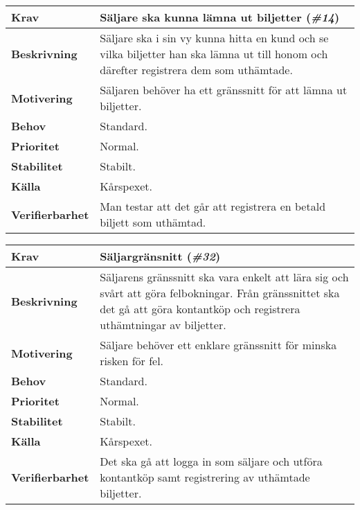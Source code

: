 \documentclass[a4paper, twoside, 11pt, titlepage]{article}
\begin{document}
		\begin{tabular} { p{2.6cm} p{12.5cm} }
			\hline
			\sffamily\textbf{Krav} & Säljare ska kunna lämna ut biljetter (\emph{\#14})  \\
			\hline
			\sffamily\textbf{Beskrivning} & Säljare ska i sin vy kunna hitta en kund och se vilka biljetter han ska lämna ut till honom och därefter registrera dem som uthämtade.  \\
			\hline
			\sffamily\textbf{Motivering} & Säljaren behöver ha ett gränssnitt för att lämna ut biljetter.  \\
			\hline
			\sffamily\textbf{Behov} & Standard.  \\
			\hline
			\sffamily\textbf{Prioritet} & Normal.  \\
			\hline
			\sffamily\textbf{Stabilitet} & Stabilt.  \\
			\hline
			\sffamily\textbf{Källa} & Kårspexet.  \\
			\hline
			\sffamily\textbf{Verifierbarhet} & Man testar att det går att registrera en betald biljett som uthämtad.  \\
			\hline
		\end{tabular}
		\vspace{6mm}

		\begin{tabular} { p{2.6cm} p{12.5cm} }
			\hline
			\sffamily\textbf{Krav} & Säljargränsnitt (\emph{\#32})  \\
			\hline
			\sffamily\textbf{Beskrivning} & Säljarens gränssnitt ska vara enkelt att lära sig och svårt att göra felbokningar. Från gränssnittet ska det gå att göra kontantköp och registrera uthämtningar av biljetter.  \\
			\hline
			\sffamily\textbf{Motivering} & Säljare behöver ett enklare gränssnitt för minska risken för fel.  \\
			\hline
			\sffamily\textbf{Behov} & Standard.  \\
			\hline
			\sffamily\textbf{Prioritet} & Normal.  \\
			\hline
			\sffamily\textbf{Stabilitet} & Stabilt.  \\
			\hline
			\sffamily\textbf{Källa} & Kårspexet.  \\
			\hline
			\sffamily\textbf{Verifierbarhet} & Det ska gå att logga in som säljare och utföra kontantköp samt registrering av uthämtade biljetter.  \\
			\hline
		\end{tabular}
		\vspace{6mm}
\end{document}

